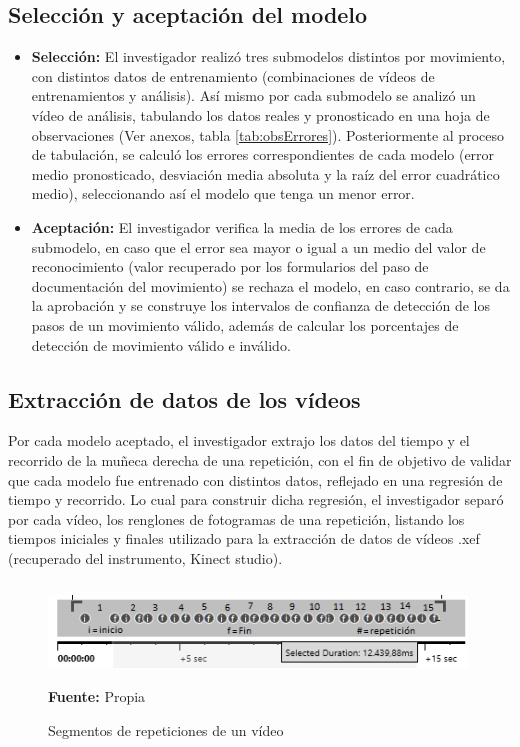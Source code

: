 \subsection{Selecci\'on y aceptaci\'on del modelo}
\begin{itemize}
\item \textbf{Selecci\'on:} El investigador realiz\'o tres submodelos distintos por movimiento, con distintos datos de entrenamiento (combinaciones de v\'ideos de entrenamientos y an\'alisis). As\'i mismo por cada submodelo se analiz\'o un v\'ideo de an\'alisis, tabulando los datos reales y pronosticado en una hoja de observaciones (Ver anexos, tabla \ref{tab:obsErrores}). Posteriormente al proceso de tabulaci\'on, se calcul\'o los errores correspondientes de cada modelo (error medio pronosticado, desviaci\'on media absoluta y la ra\'iz del error cuadr\'atico medio), seleccionando as\'i el modelo que tenga un menor error. 
\item \textbf{Aceptaci\'on:} El investigador  verifica la media de los errores de cada submodelo, en caso que el error sea mayor o igual  a un medio del valor de reconocimiento (valor recuperado por los formularios del paso de documentaci\'on del movimiento) se rechaza el modelo, en caso contrario, se da la aprobaci\'on y se construye los intervalos de confianza de detecci\'on de los pasos de un movimiento v\'alido, adem\'as de calcular los porcentajes de detecci\'on de movimiento v\'alido e inv\'alido.
\end{itemize}
\subsection{Extracci\'on de datos de los v\'ideos}
Por cada modelo aceptado, el investigador extrajo los datos del tiempo y el recorrido de la mu\~neca derecha de una repetici\'on, con el fin de objetivo de validar que cada modelo fue entrenado con distintos datos, reflejado en una  regresi\'on de tiempo y recorrido. Lo cual para construir dicha regresi\'on, el investigador separ\'o por cada v\'ideo, los renglones de fotogramas de una repetici\'on, listando los tiempos iniciales y finales utilizado para la extracci\'on de datos de v\'ideos .xef (recuperado del instrumento, Kinect studio).
\begin{figure}[H]
	\caption{Segmentos de repeticiones de un v\'ideo}
	\label{fig:segVideo}
	\centering
	\includegraphics[width=420px,height=100px]{graphics/separarPuntos.PNG} \\
	\textbf{Fuente:} Propia
\end{figure} 
